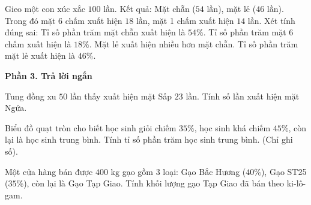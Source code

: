 \begin{ex} %
Gieo một con xúc xắc $100$ lần. Kết quả: Mặt chẵn ($54$ lần), mặt lẻ ($46$ lần). Trong đó mặt 6 chấm xuất hiện $18$ lần, mặt 1 chấm xuất hiện $14$ lần. Xét tính đúng sai:
\choiceTF
{\True Tỉ số phần trăm mặt chẵn xuất hiện là $54\%$.}
{\True Tỉ số phần trăm mặt 6 chấm xuất hiện là $18\%$.}
{Mặt lẻ xuất hiện nhiều hơn mặt chẵn.}
{\True Tỉ số phần trăm mặt lẻ xuất hiện là $46\%$.}
\end{ex}

\textbf{Phần 3. Trả lời ngắn}

\begin{ex} %
Tung đồng xu $50$ lần thấy xuất hiện mặt Sấp $23$ lần. Tính số lần xuất hiện mặt Ngửa.
\end{ex}

\begin{ex} %
Biểu đồ quạt tròn cho biết học sinh giỏi chiếm $35\%$, học sinh khá chiếm $45\%$, còn lại là học sinh trung bình. Tính tỉ số phần trăm học sinh trung bình. (Chỉ ghi số).
\end{ex}

\begin{ex} %
Một cửa hàng bán được $400\text{ kg}$ gạo gồm $3$ loại: Gạo Bắc Hương ($40\%$), Gạo ST25 ($35\%$), còn lại là Gạo Tạp Giao. Tính khối lượng gạo Tạp Giao đã bán theo ki-lô-gam.
\end{ex}

